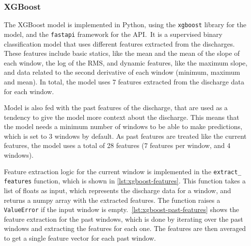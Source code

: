 \subsubsection{XGBoost}\label{subsubsec:xgboost}

The XGBoost model is implemented in Python, using the \texttt{xgboost} library for the model, and the \texttt{fastapi} framework for the API.\ It is a supervised binary classification model that uses different features extracted from the discharges. These features include basic statics, like the mean and the mean of the slope of each window, the log of the \ac{RMS}, and dynamic features, like the maximum slope, and data related to the second derivative of each window (minimum, maximum and mean). In total, the model uses 7 features extracted from the discharge data for each window.

Model is also fed with the past features of the discharge, that are used as a tendency to give the model more context about the discharge. This means that the model needs a minimum number of windows to be able to make predictions, which is set to 3 windows by default. As past features are treated like the current features, the model uses a total of 28 features (7 features per window, and 4 windows). 

Feature extraction logic for the current window is implemented in the \texttt{extract\_ features} function, which is shown in \autoref{lst:xgboost-features}. This function takes a list of floats as input, which represents the discharge data for a window, and returns a numpy array with the extracted features. The function raises a \texttt{ValueError} if the input window is empty.\ \autoref{lst:xgboost-past-features} shows the feature extraction for the past windows, which is done by iterating over the past windows and extracting the features for each one. The features are then averaged to get a single feature vector for each past window.

